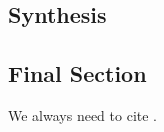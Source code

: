 \begin{multicols}{2}
\section{Synthesis}

\subsection*{Final Section}

We always need to cite .

\textcolor{black!35}{\lipsum[1-3]}

\end{multicols}
